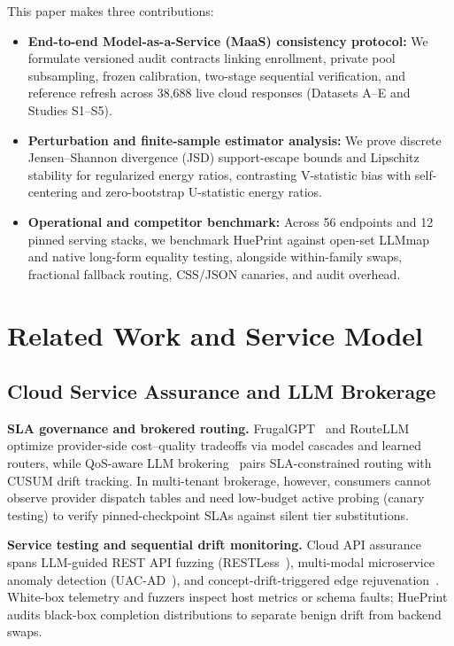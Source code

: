 This paper makes three contributions:
\begin{itemize}
    \item \textbf{End-to-end Model-as-a-Service (MaaS) consistency protocol:} We formulate versioned audit contracts linking enrollment, private pool subsampling, frozen calibration, two-stage sequential verification, and reference refresh across 38,688 live cloud responses (Datasets A--E and Studies S1--S5).
    \item \textbf{Perturbation and finite-sample estimator analysis:} We prove discrete Jensen--Shannon divergence (JSD) support-escape bounds and Lipschitz stability for regularized energy ratios, contrasting V-statistic bias with self-centering and zero-bootstrap U-statistic energy ratios.
    \item \textbf{Operational and competitor benchmark:} Across 56 endpoints and 12 pinned serving stacks, we benchmark HuePrint against open-set LLMmap and native long-form equality testing, alongside within-family swaps, fractional fallback routing, CSS/JSON canaries, and audit overhead.
\end{itemize}

\section{Related Work and Service Model}

\subsection{Cloud Service Assurance and LLM Brokerage}
\textbf{SLA governance and brokered routing.} FrugalGPT~\cite{ref1} and RouteLLM~\cite{ref2} optimize provider-side cost--quality tradeoffs via model cascades and learned routers, while QoS-aware LLM brokering~\cite{ref3} pairs SLA-constrained routing with CUSUM drift tracking. In multi-tenant brokerage, however, consumers cannot observe provider dispatch tables and need low-budget active probing (canary testing) to verify pinned-checkpoint SLAs against silent tier substitutions.

\textbf{Service testing and sequential drift monitoring.} Cloud API assurance spans LLM-guided REST API fuzzing (RESTLess~\cite{ref8}), multi-modal microservice anomaly detection (UAC-AD~\cite{ref9}), and concept-drift-triggered edge rejuvenation~\cite{ref10}. White-box telemetry and fuzzers inspect host metrics or schema faults; HuePrint audits black-box completion distributions to separate benign drift from backend swaps.

